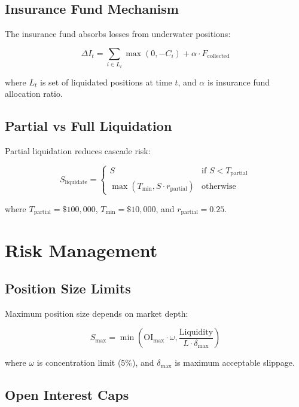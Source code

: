 \documentclass[11pt,a4paper]{article}
\begin{document}
\subsection{Insurance Fund Mechanism}

The insurance fund absorbs losses from underwater positions:

\begin{equation}
\Delta I_t = \sum_{i \in L_t} \max(0, -C_i) + \alpha \cdot F_{\text{collected}}
\end{equation}

where $L_t$ is set of liquidated positions at time $t$, and $\alpha$ is insurance fund allocation ratio.

\subsection{Partial vs Full Liquidation}

Partial liquidation reduces cascade risk:

\begin{equation}
S_{\text{liquidate}} = \begin{cases}
S & \text{if } S < T_{\text{partial}} \\
\max(T_{\text{min}}, S \cdot r_{\text{partial}}) & \text{otherwise}
\end{cases}
\end{equation}

where $T_{\text{partial}} = \$100,000$, $T_{\text{min}} = \$10,000$, and $r_{\text{partial}} = 0.25$.

\section{Risk Management}

\subsection{Position Size Limits}

Maximum position size depends on market depth:

\begin{equation}
S_{\text{max}} = \min\left(\text{OI}_{\text{max}} \cdot \omega, \frac{\text{Liquidity}}{L \cdot \delta_{\text{max}}}\right)
\end{equation}

where $\omega$ is concentration limit (5\%), and $\delta_{\text{max}}$ is maximum acceptable slippage.

\subsection{Open Interest Caps}
\end{document}
